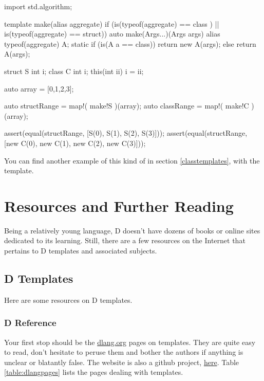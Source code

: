 \begin{dcode}
import std.algorithm;

template make(alias aggregate) 
    if (is(typeof(aggregate) == class ) 
     || is(typeof(aggregate) == struct))
{
    auto make(Args...)(Args args)
    {
        alias typeof(aggregate) A;        
        static if (is(A a == class))
            return new A(args);
        else
            return A(args);
    }
}

struct S {int i;}
class C {int i; this(int ii) { i = ii;}}

auto array = [0,1,2,3];

auto structRange = map!( make!S )(array);
auto classRange  = map!( make!C )(array);

assert(equal(structRange, [S(0), S(1), S(2), S(3)]));
assert(equal(structRange, [new C(0), new C(1), new C(2), new C(3)]));
\end{dcode}

You can find another example of this kind of  in section \ref{classtemplates}, with the  template.

\section{Resources and Further Reading}
\label{resources}


Being a relatively young language, D doesn't have dozens of books or online sites dedicated to its learning. Still, there are a few resources on the Internet that pertains to D templates and associated subjects.

\subsection{D Templates}

Here are some resources on D templates.

\subsubsection{D Reference}

Your first stop should be the \href{http://dlang.org}{dlang.org} pages on templates. They are quite easy to read, don't hesitate to peruse them and bother the authors if anything is unclear or blatantly false. The  website is also a github project, \href{https://github.com/D-Programming-Language/d-programming-language.org}{here}. Table \ref{table:dlangpages} lists the pages dealing with templates.


